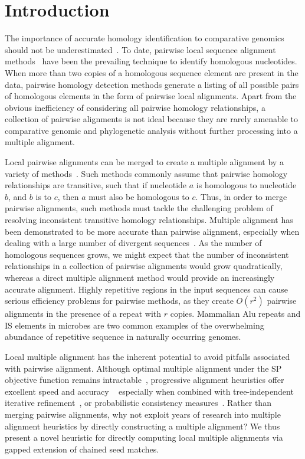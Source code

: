 \documentclass{ws-procs975x65}
\begin{document}

\section{Introduction}
The importance of accurate homology identification to comparative genomics should not be underestimated~\cite{Kumar07}. To date, pairwise local sequence alignment methods~\cite{ref-blastz,ref-ssearch} have been the prevailing technique to identify homologous nucleotides.  When more than two copies of a homologous sequence element are present in the data, pairwise homology detection methods generate a listing of all possible pairs of homologous elements in the form of pairwise local alignments.  Apart from the obvious inefficiency of considering all pairwise homology relationships, a collection of pairwise alignments is not ideal because they are rarely amenable to comparative genomic and phylogenetic analysis without further processing into a multiple alignment.

Local pairwise alignments can be merged to create a multiple alignment by a variety of methods~\cite{ref-tba,ref-aba,ref-dialign,ref-related1}. Such methods commonly assume that pairwise homology relationships are transitive, such that if nucleotide $a$ is homologous to nucleotide $b$, and $b$ is to $c$, then $a$ must also be homologous to $c$.  Thus, in order to merge pairwise alignments, such methods must tackle the challenging problem of resolving inconsistent transitive homology relationships.  Multiple alignment has been demonstrated to be more accurate than pairwise alignment, especially when dealing with a large number of divergent sequences~\cite{ref-mlagan,ref-aubergene}.  As the number of homologous sequences grows, we might expect that the number of inconsistent relationships in a collection of pairwise alignments would grow quadratically, whereas a direct multiple alignment method would provide an increasingly accurate alignment.  Highly repetitive regions in the input sequences can cause serious efficiency problems for pairwise methods, as they create $O(r^{2})$ pairwise alignments in the presence of a repeat with $r$ copies.  Mammalian Alu repeats and IS elements in microbes are two common examples of the overwhelming abundance of repetitive sequence in naturally occurring genomes.

Local multiple alignment has the inherent potential to avoid pitfalls associated with pairwise alignment. Although optimal multiple alignment under the SP objective function remains intractable~\cite{ref-wangjiang}, progressive alignment heuristics offer excellent speed and accuracy
~\cite{ref-clustalw,ref-tcoffee} especially when combined with tree-independent iterative refinement~\cite{ref-muscle}, or probabilistic consistency measures~\cite{ref-probcons}. Rather than merging pairwise alignments, why not exploit years of research into multiple alignment heuristics by directly constructing a multiple alignment? We thus present a novel heuristic for directly computing local multiple alignments via gapped extension of chained seed matches.
\end{document}
